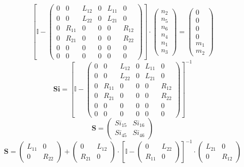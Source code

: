 \[ \left[ \mathbb{I}  - \left(\begin{array}{cccccc} 0 & 0 & L_{12} & 0
& L_{11} & 0 \\ 0 & 0 & L_{22} & 0 & L_{21} & 0 \\ 0 & R_{11} & 0 & 0
& 0 & R_{12} \\ 0 & R_{21} & 0 & 0 & 0 & R_{22} \\ 0 & 0 & 0 & 0 & 0 &
0 \\ 0 & 0 & 0 & 0 & 0 & 0 \end{array}\right)\right] \cdot
\left(\begin{array}{c} n_{2} \\ n_{5} \\ n_{6} \\ n_{4} \\ n_{1} \\
n_{3} \end{array}\right) = \left(\begin{array}{c} 0 \\ 0 \\ 0 \\ 0 \\
m_{1} \\ m_{2} \end{array}\right) \]
\[ \mathbf{Si} = \left[ \mathbb{I}  - \left(\begin{array}{cccccc} 0 &
0 & L_{12} & 0 & L_{11} & 0 \\ 0 & 0 & L_{22} & 0 & L_{21} & 0 \\ 0 &
R_{11} & 0 & 0 & 0 & R_{12} \\ 0 & R_{21} & 0 & 0 & 0 & R_{22} \\ 0 &
0 & 0 & 0 & 0 & 0 \\ 0 & 0 & 0 & 0 & 0 & 0 \end{array}\right)
\right]^{-1} \]
\[ \mathbf{S} = \left(\begin{array}{cc} Si_{15} & Si_{16} \\ Si_{45} &
Si_{46} \end{array}\right) \]
\[ \mathbf{S} = \left(\begin{array}{cc} L_{11} & 0 \\ 0 & R_{22}
\end{array}\right) + \left(\begin{array}{cc} 0 & L_{12} \\ R_{21} & 0
\end{array}\right) \cdot \left[ \mathbb{I}  - \left(\begin{array}{cc}
0 & L_{22} \\ R_{11} & 0 \end{array}\right) \right]^{-1}
\cdot\left(\begin{array}{cc} L_{21} & 0 \\ 0 & R_{12}
\end{array}\right) \]
